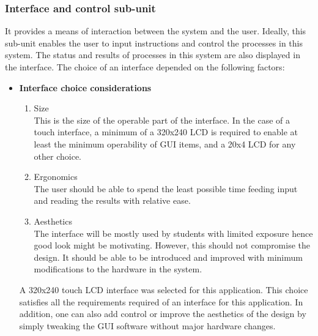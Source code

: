 \subsubsection{Interface and control sub-unit}
It provides a means of interaction between the system and the user. Ideally, this sub-unit enables the user to input instructions and control the processes in this system. The status and results of processes in this system are also displayed in the interface. The choice of an interface depended on the following factors:
\begin{itemize}
    \item \textbf{Interface choice considerations}\\
    \begin{enumerate}
    \item Size \\
    This is the size of the operable part of the interface. In the case of a touch interface, a minimum of a 320x240 LCD is required to enable at least the minimum operability of GUI items, and a 20x4 LCD for any other choice.
    \item Ergonomics \\
    The user should be able to spend the least possible time feeding input and reading the results with relative ease. 
    \item Aesthetics \\
      The interface will be mostly used by students with limited exposure hence good look might be motivating. However, this should not compromise the design. It should be able to be introduced and improved with minimum modifications to the hardware in the system. 
    \end{enumerate}
     A 320x240 touch LCD interface was selected for this application. This choice satisfies all the requirements required of an interface for this application. In addition, one can also add control or  improve the aesthetics of the design by simply tweaking the GUI software without major hardware changes.


\end{itemize}
